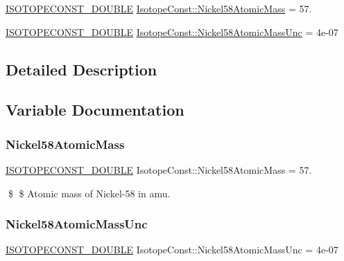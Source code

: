 \begin{DoxyCompactItemize}
\item 
\mbox{\hyperlink{group___isotope_const-_macros_ga8f45a7272ce02c0b4c65c44636ed719a}{I\+S\+O\+T\+O\+P\+E\+C\+O\+N\+S\+T\+\_\+\+D\+O\+U\+B\+LE}} \mbox{\hyperlink{group___isotope_const-_nickel-_ni58_ga6243c80afb7de3893d23935c48705eab}{Isotope\+Const\+::\+Nickel58\+Atomic\+Mass}} = 57.
\item 
\mbox{\hyperlink{group___isotope_const-_macros_ga8f45a7272ce02c0b4c65c44636ed719a}{I\+S\+O\+T\+O\+P\+E\+C\+O\+N\+S\+T\+\_\+\+D\+O\+U\+B\+LE}} \mbox{\hyperlink{group___isotope_const-_nickel-_ni58_gabb0e1567b0b5e1eab5ae7970c8caa4c1}{Isotope\+Const\+::\+Nickel58\+Atomic\+Mass\+Unc}} = 4e-\/07
\end{DoxyCompactItemize}


\subsection{Detailed Description}


\subsection{Variable Documentation}
\mbox{\label{group___isotope_const-_nickel-_ni58_ga6243c80afb7de3893d23935c48705eab}} 
\subsubsection{\texorpdfstring{Nickel58\+Atomic\+Mass}{Nickel58AtomicMass}}
{\footnotesize\ttfamily \mbox{\hyperlink{group___isotope_const-_macros_ga8f45a7272ce02c0b4c65c44636ed719a}{I\+S\+O\+T\+O\+P\+E\+C\+O\+N\+S\+T\+\_\+\+D\+O\+U\+B\+LE}} Isotope\+Const\+::\+Nickel58\+Atomic\+Mass = 57.}

\$ \$ Atomic mass of Nickel-\/58 in amu. \mbox{\label{group___isotope_const-_nickel-_ni58_gabb0e1567b0b5e1eab5ae7970c8caa4c1}} 
\subsubsection{\texorpdfstring{Nickel58\+Atomic\+Mass\+Unc}{Nickel58AtomicMassUnc}}
{\footnotesize\ttfamily \mbox{\hyperlink{group___isotope_const-_macros_ga8f45a7272ce02c0b4c65c44636ed719a}{I\+S\+O\+T\+O\+P\+E\+C\+O\+N\+S\+T\+\_\+\+D\+O\+U\+B\+LE}} Isotope\+Const\+::\+Nickel58\+Atomic\+Mass\+Unc = 4e-\/07}

